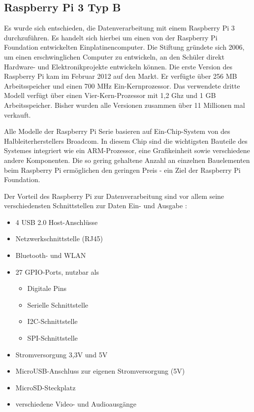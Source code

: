 \documentclass[a4paper,12pt,bibliography=totoc, listof=totoc,titlepage]{scrreprt}
\begin{document}
\subsection{Raspberry Pi 3 Typ B}
\label{ss:Raspberry}
Es wurde sich entschieden, die Datenverarbeitung mit einem Raspberry Pi 3 durchzuführen. Es handelt sich hierbei um einen von der Raspberry Pi Foundation entwickelten Einplatinencomputer. Die Stiftung gründete sich 2006, um einen erschwinglichen Computer zu entwickeln, an den Schüler direkt Hardware- und Elektronikprojekte entwickeln können. Die erste Version des Raspberry Pi kam im Februar 2012 auf den Markt. Er verfügte über 256 MB Arbeitsspeicher und einen 700 MHz Ein-Kernprozessor. Das verwendete dritte Modell verfügt über einen Vier-Kern-Prozessor mit 1,2 Ghz und 1 GB Arbeitsspeicher. Bisher wurden alle Versionen zusammen über 11 Millionen mal verkauft. \citep{heise5Rasp}

Alle Modelle der Raspberry Pi Serie basieren auf Ein-Chip-System von des Halbleiterherstellers Broadcom. In diesem Chip sind die wichtigsten Bauteile des Systemes integriert wie ein ARM-Prozessor, eine Grafikeinheit sowie verschiedene andere Komponenten. Die so gering gehaltene Anzahl an einzelnen Bauelementen beim Raspberry Pi ermöglichen den geringen Preis - ein Ziel der Raspberry Pi Foundation.

Der Vorteil des Raspberry Pi zur Datenverarbeitung sind vor allem seine verschiedensten Schnittstellen zur Daten Ein- und Ausgabe \citep{raspSheet}:
\begin{itemize}
 \item 4 USB 2.0 Host-Anschlüsse
 \item Netzwerkschnittstelle (RJ45)
 \item Bluetooth- und WLAN
 \item 27 GPIO-Ports, nutzbar als \citep{ekRaspPin}
 \begin{itemize} 
  \item Digitale Pins
  \item Serielle Schnittstelle
  \item I2C-Schnittstelle
  \item SPI-Schnittstelle
 \end{itemize}
 \item Stromversorgung 3,3V und 5V
 \item MicroUSB-Anschluss zur eigenen Stromversorgung (5V)
 \item MicroSD-Steckplatz 
 \item verschiedene Video- und Audioausgänge
 \end{itemize}
\end{document}
